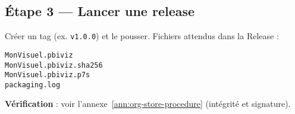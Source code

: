 \subsection*{Étape 3 — Lancer une release}
Créer un tag (ex. \texttt{v1.0.0}) et le pousser. Fichiers attendus dans la Release :
\begin{verbatim}
MonVisuel.pbiviz
MonVisuel.pbiviz.sha256
MonVisuel.pbiviz.p7s
packaging.log
\end{verbatim}

\textbf{Vérification} : voir l’annexe~\ref{ann:org-store-procedure} (intégrité et signature).

